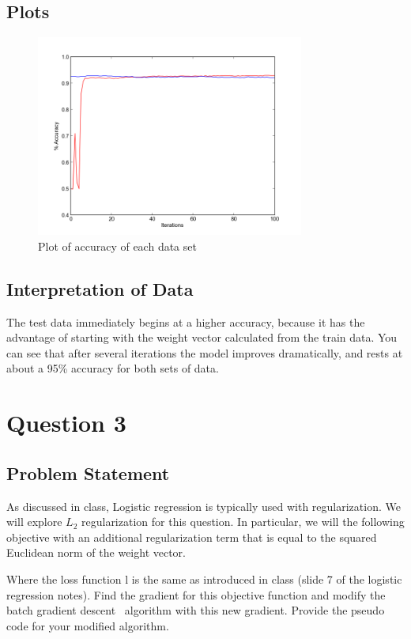 \documentclass[letterpaper,10pt]{article}
\begin{document}
\subsection{Plots}
     \begin{figure}[ht]
    \centering
   \includegraphics[width=250pt]{gradientDescentImprovement1.png}
    \caption{Plot of accuracy of each data set}
    \label{fig:Plot of accuracy over iterations. Red is training data}
    \end{figure}
\subsection{Interpretation of Data}
The test data immediately begins at a higher accuracy, because it has the advantage of starting with the weight vector calculated from the train data. You can see that after several iterations the model improves dramatically, and rests at about a 95\% accuracy for both sets of data.


\section{Question 3}
\subsection{Problem Statement}
As discussed in class, Logistic regression is typically used with regularization. We will explore 
\(L_2\) regularization for this question. In particular, we will the following objective with an 
additional regularization term that is equal to the squared Euclidean norm of the weight vector.

Where the loss function l is the same as introduced in class (slide 7 of the logistic regression 
notes). Find the gradient for this objective function and modify the batch gradient descent \
algorithm with this new gradient. Provide the pseudo code for your modified algorithm.
\end{document}
